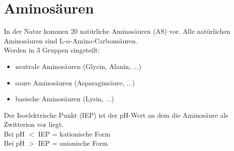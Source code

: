 \section{Aminosäuren}
In der Natur kommen 20 natürliche Aminosäuren (AS) vor.
Alle natürlichen Aminosäuren sind L-$\alpha$-Amino-Carbonsäuren. \\
Werden in 3 Gruppen eingeteilt:
\begin{itemize}
    \item neutrale Aminosäuren (Glycin, Alanin, ...)
    \item saure Aminosäuren (Asparaginsäure, ...)
    \item basische Aminosäuren (Lysin, ...)
\end{itemize}
Der Isoelektrische Punkt (IEP) ist der pH-Wert an dem die Aminosäure als Zwitterion vor liegt. \\
Bei pH $<$ IEP = kationische Form \\
Bei pH $>$ IEP = anionische Form

